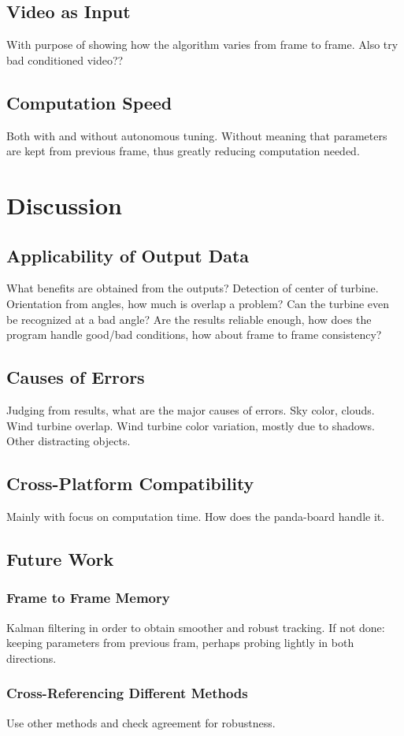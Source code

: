 \documentclass[a4paper,10pt]{article}
\begin{document}
  \subsection{Video as Input}
  With purpose of showing how the algorithm varies from frame to frame. Also try bad conditioned video??
  \subsection{Computation Speed}
  Both with and without autonomous tuning. Without meaning that parameters are kept from previous frame, thus greatly reducing computation needed.
  
\section{Discussion}
  \subsection{Applicability of Output Data}
  What benefits are obtained from the outputs? Detection of center of turbine. Orientation from angles, how much is overlap a problem? Can the turbine even be recognized at a bad angle?
  Are the results reliable enough, how does the program handle good/bad conditions, how about frame to frame consistency?
  \subsection{Causes of Errors}
  Judging from results, what are the major causes of errors. Sky color, clouds. Wind turbine overlap. Wind turbine color variation, mostly due to shadows. Other distracting objects.
  \subsection{Cross-Platform Compatibility}
  Mainly with focus on computation time. How does the panda-board handle it.
  \subsection{Future Work}
    \subsubsection{Frame to Frame Memory}
    Kalman filtering in order to obtain smoother and robust tracking. If not done: keeping parameters from previous fram, perhaps probing lightly in both directions.
    \subsubsection{Cross-Referencing Different Methods}
    Use other methods and check agreement for robustness.
\end{document}
